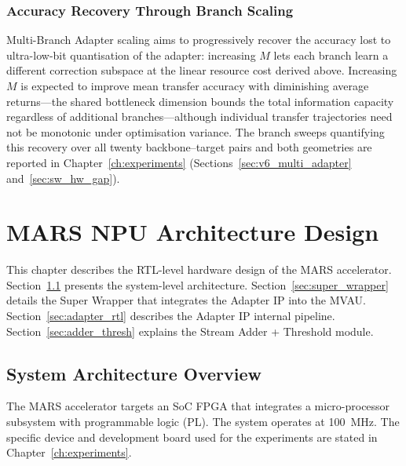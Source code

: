 \documentclass[12pt, a4paper]{report}
\numberwithin{equation}{chapter}
\numberwithin{figure}{chapter}
\numberwithin{table}{chapter}
\numberwithin{algorithm}{chapter}
\begin{document}
\subsection{Accuracy Recovery Through Branch Scaling}
\enlargethispage{2\baselineskip}

Multi-Branch Adapter scaling aims to progressively recover the accuracy lost to ultra-low-bit quantisation of the adapter: increasing $M$ lets each branch learn a different correction subspace at the linear resource cost derived above. Increasing $M$ is expected to improve mean transfer accuracy with diminishing average returns---the shared bottleneck dimension bounds the total information capacity regardless of additional branches---although individual transfer trajectories need not be monotonic under optimisation variance. The branch sweeps quantifying this recovery over all twenty backbone--target pairs and both geometries are reported in Chapter~\ref{ch:experiments} (Sections~\ref{sec:v6_multi_adapter} and~\ref{sec:sw_hw_gap}).


\chapter{MARS NPU Architecture Design}
\label{ch:hardware}

This chapter describes the RTL-level hardware design of the MARS accelerator. Section~\ref{sec:sys_arch} presents the system-level architecture. Section~\ref{sec:super_wrapper} details the Super Wrapper that integrates the Adapter IP into the MVAU. Section~\ref{sec:adapter_rtl} describes the Adapter IP internal pipeline. Section~\ref{sec:adder_thresh} explains the Stream Adder + Threshold module.

\section{System Architecture Overview}
\label{sec:sys_arch}

The MARS accelerator targets an SoC FPGA that integrates a micro-processor subsystem with programmable logic (PL). The system operates at 100~MHz. The specific device and development board used for the experiments are stated in Chapter~\ref{ch:experiments}.
\end{document}
